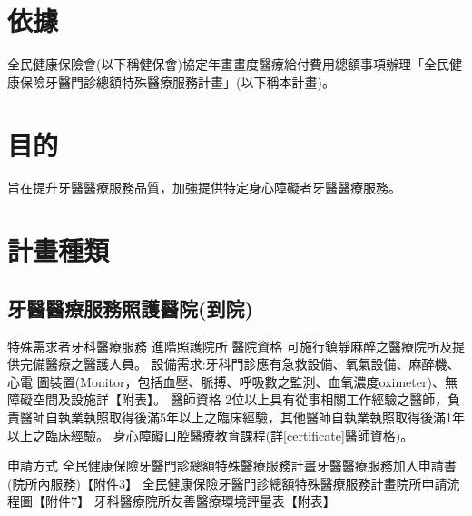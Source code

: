 \section{依據}
全民健康保險會(以下稱健保會)協定年畫畫度醫療給付費用總額事項辦理「全民健康保險牙醫門診總額特殊醫療服務計畫」(以下稱本計畫)。

\section{目的} 旨在提升牙醫醫療服務品質，加強提供特定身心障礙者牙醫醫療服務。

\section{計畫種類}

\subsection{牙醫醫療服務照護醫院(到院)}
\begin{outline}
\0 特殊需求者牙科醫療服務
\1 進階照護院所
\2 醫院資格
    \3 可施行鎮靜麻醉之醫療院所及提供完備醫療之醫護人員。
    \3 設備需求:牙科門診應有急救設備、氧氣設備、麻醉機、心電 圖裝置(Monitor，包括血壓、脈搏、呼吸數之監測、血氧濃度oximeter)、無障礙空間及設施詳【附表】。
\2 醫師資格
    \3 2位以上具有從事相關工作經驗之醫師，負責醫師自執業執照取得後滿5年以上之臨床經驗，其他醫師自執業執照取得後滿1年以上之臨床經驗。
    \3 身心障礙口腔醫療教育課程(詳\ref{certificate}醫師資格)。

\0 申請方式
\1 全民健康保險牙醫門診總額特殊醫療服務計畫牙醫醫療服務加入申請書(院所內服務)【附件3】
\1 全民健康保險牙醫門診總額特殊醫療服務計畫院所申請流程圖【附件7】
\1 牙科醫療院所友善醫療環境評量表【附表】

\end{outline}


